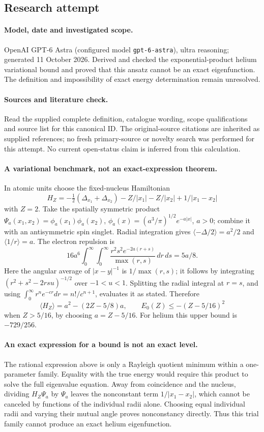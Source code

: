 \documentclass[11pt]{article}
\begin{document}
\subsection{Research attempt}
\paragraph{Model, date and investigated scope.}
OpenAI GPT-6 Astra (configured model \texttt{gpt-6-astra}), ultra reasoning; generated 11 October 2026. Derived and checked the exponential-product helium variational bound and proved that this ansatz cannot be an exact eigenfunction. The definition and impossibility of exact energy determination remain unresolved.

\paragraph{Sources and literature check.}
Read the supplied complete definition, catalogue wording, scope qualifications and source list for this canonical ID. The original-source citations are inherited as supplied references; no fresh primary-source or novelty search was performed for this attempt. No current open-status claim is inferred from this calculation.

\paragraph{A variational benchmark, not an exact-expression theorem.}In atomic units choose the fixed-nucleus Hamiltonian
\[H_Z=-\tfrac12(\Delta_{x_1}+\Delta_{x_2})-Z/|x_1|-Z/|x_2|+1/|x_1-x_2|\]
with \(Z=2\). Take the spatially symmetric product \(\Psi_a(x_1,x_2)=\phi_a(x_1)\phi_a(x_2)\), \(\phi_a(x)=(a^3/\pi)^{1/2}e^{-a|x|}\), \(a>0\); combine it with an antisymmetric spin singlet. Radial integration gives \(\langle-\Delta/2\rangle=a^2/2\) and \(\langle1/r\rangle=a\). The electron repulsion is
\[16a^6\int_0^\infty\!\int_0^\infty\frac{r^2s^2e^{-2a(r+s)}}{\max(r,s)}\,dr\,ds=5a/8.
\]
Here the angular average of \(|x-y|^{-1}\) is \(1/\max(r,s)\); it follows by integrating \((r^2+s^2-2rsu)^{-1/2}\) over \(-1<u<1\). Splitting the radial integral at \(r=s\), and using \(\int_0^\infty r^ne^{-cr}dr=n!/c^{n+1}\), evaluates it as stated. Therefore
\[\langle H_Z\rangle=a^2-(2Z-5/8)a,\qquad E_0(Z)\le-(Z-5/16)^2\]
when \(Z>5/16\), by choosing \(a=Z-5/16\). For helium this upper bound is \(-729/256\).
\paragraph{An exact expression for a bound is not an exact level.}The rational expression above is only a Rayleigh quotient minimum within a one-parameter family. Equality with the true energy would require this product to solve the full eigenvalue equation. Away from coincidence and the nucleus, dividing \(H_Z\Psi_a\) by \(\Psi_a\) leaves the nonconstant term \(1/|x_1-x_2|\), which cannot be canceled by functions of the individual radii alone. Choosing equal individual radii and varying their mutual angle proves nonconstancy directly. Thus this trial family cannot produce an exact helium eigenfunction.
\end{document}
